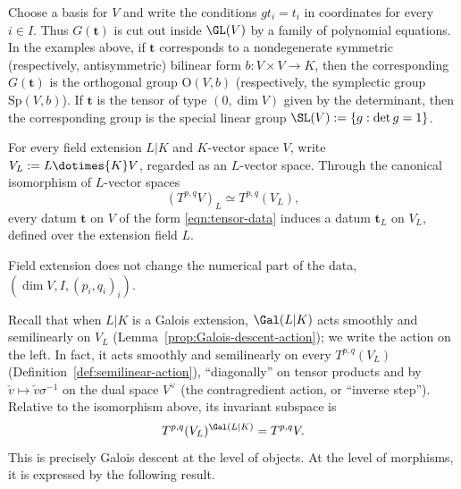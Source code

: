 Choose a basis for $V$ and write the conditions $gt_i=t_i$ in coordinates
for every $i\in I$. Thus $G(\mathbf{t})$ is cut out inside $\GL(V)$ by a
family of polynomial equations. In the examples above, if $\mathbf{t}$
corresponds to a nondegenerate symmetric (respectively, antisymmetric)
bilinear form $b:V\times V\to K$, then the corresponding $G(\mathbf{t})$ is
the orthogonal group $\mathrm{O}(V,b)$ (respectively, the symplectic group
$\mathrm{Sp}(V,b)$). If $\mathbf{t}$ is the tensor of type $(0,\dim V)$ given
by the determinant, then the corresponding group is the special linear
group $\SL(V):=\{g:\det g=1\}$.

\begin{definition}\label{def:tL}
	For every field extension $L|K$ and $K$-vector space $V$, write
	$V_L:=L\dotimes{K}V$, regarded as an $L$-vector space. Through the canonical
	isomorphism of $L$-vector spaces
	\[
	(T^{p,q}V)_L\simeq T^{p,q}(V_L),
	\]
	every datum $\mathbf{t}$ on $V$ of the form \eqref{eqn:tensor-data}
	induces a datum $\mathbf{t}_L$ on $V_L$, defined over the extension field
	$L$.
\end{definition}

Field extension does not change the numerical part of the data,
$(\dim V,I,(p_i,q_i)_i)$.

Recall that when $L|K$ is a Galois extension, $\Gal(L|K)$ acts smoothly and
semilinearly on $V_L$ (Lemma~\ref{prop:Galois-descent-action}); we write the
action on the left. In fact, it acts smoothly and semilinearly on every
$T^{p,q}(V_L)$ (Definition~\ref{def:semilinear-action}), ``diagonally'' on
tensor products and by $\check v\mapsto\check v\sigma^{-1}$ on the dual space
$V^\vee$ (the contragredient action, or ``inverse step''). Relative to the
isomorphism above, its invariant subspace is
\[
T^{p,q}(V_L)^{\Gal(L|K)}=T^{p,q}V.
\]
This is precisely Galois descent at the level of objects. At the level of
morphisms, it is expressed by the following result.

